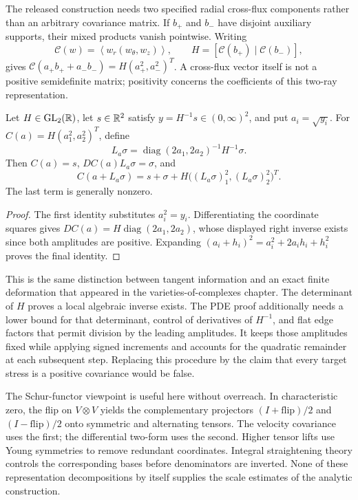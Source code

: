 The released construction needs two specified radial cross-flux components rather than an arbitrary covariance matrix. If $b_+$ and $b_-$ have disjoint auxiliary supports, their mixed products vanish pointwise. Writing
\[
 \mathcal C(w)=\left\langle w_r(w_\theta,w_z)\right\rangle,
 \qquad H=[\mathcal C(b_+)\mid\mathcal C(b_-)],
\]
gives $\mathcal C(a_+b_++a_-b_-)=H(a_+^2,a_-^2)^T$. A cross-flux vector itself is not a positive semidefinite matrix; positivity concerns the coefficients of this two-ray representation.

\begin{proposition}
\label{prop:fluid-covariance}
Let $H\in\operatorname{GL}_2(\mathbb{R})$, let $s\in\mathbb{R}^2$ satisfy $y=H^{-1}s\in(0,\infty)^2$, and put $a_i=\sqrt{y_i}$. For $C(a)=H(a_1^2,a_2^2)^T$, define
\[
 L_a\sigma=\operatorname{diag}(2a_1,2a_2)^{-1}H^{-1}\sigma.
\]
Then $C(a)=s$, $D C(a)L_a\sigma=\sigma$, and
\[
 C(a+L_a\sigma)=s+\sigma+H\big((L_a\sigma)_1^2,(L_a\sigma)_2^2\big)^T.
\]
The last term is generally nonzero.
\end{proposition}
\begin{proof}
The first identity substitutes $a_i^2=y_i$. Differentiating the coordinate squares gives $D C(a)=H\operatorname{diag}(2a_1,2a_2)$, whose displayed right inverse exists since both amplitudes are positive. Expanding $(a_i+h_i)^2=a_i^2+2a_ih_i+h_i^2$ proves the final identity.
\end{proof}

This is the same distinction between tangent information and an exact finite deformation that appeared in the varieties-of-complexes chapter. The determinant of $H$ proves a local algebraic inverse exists. The PDE proof additionally needs a lower bound for that determinant, control of derivatives of $H^{-1}$, and flat edge factors that permit division by the leading amplitudes. It keeps those amplitudes fixed while applying signed increments and accounts for the quadratic remainder at each subsequent step. Replacing this procedure by the claim that every target stress is a positive covariance would be false.

The Schur-functor viewpoint is useful here without overreach. In characteristic zero, the flip on $V\otimes V$ yields the complementary projectors $(I+\mathrm{flip})/2$ and $(I-\mathrm{flip})/2$ onto symmetric and alternating tensors. The velocity covariance uses the first; the differential two-form uses the second. Higher tensor lifts use Young symmetries to remove redundant coordinates. Integral straightening theory controls the corresponding bases before denominators are inverted. None of these representation decompositions by itself supplies the scale estimates of the analytic construction.

